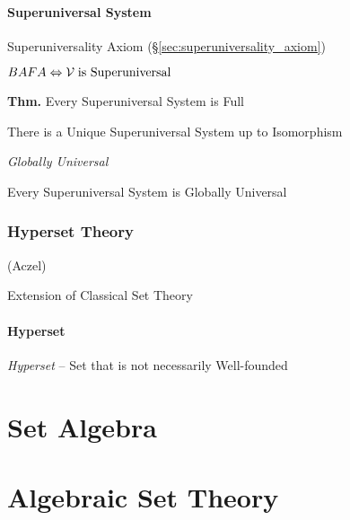 \paragraph{Superuniversal System}\label{sec:superuniversal_system}
\hfill

Superuniversality Axiom (\S\ref{sec:superuniversality_axiom})

$BAFA \Leftrightarrow \mathcal{V} \;\text{is Superuniversal}$

\textbf{Thm.} Every Superuniversal System is Full

There is a Unique Superuniversal System up to Isomorphism

\emph{Globally Universal}

Every Superuniversal System is Globally Universal



\subsubsection{Hyperset Theory}\label{sec:hyperset_theory}

(Aczel)

Extension of Classical Set Theory




\paragraph{Hyperset}\label{sec:hyperset}\hfill

\emph{Hyperset} -- Set that is not necessarily Well-founded



\section{Set Algebra}\label{sec:set_algebra}

\section{Algebraic Set Theory}\label{sec:algebraic_set_theory}

